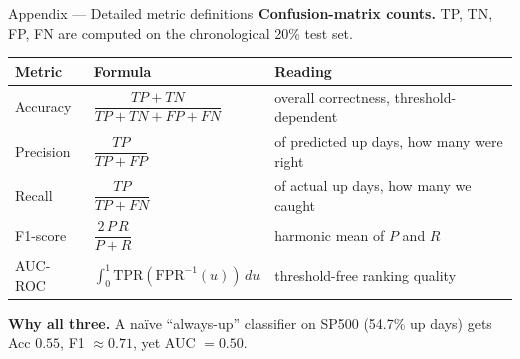 \documentclass[aspectratio=169,11pt]{beamer}
\newcommand{\heading}[1]{{\color{TecBlue}\textbf{#1}}}
\begin{document}
\begin{frame}{Appendix --- Detailed metric definitions}
\footnotesize
\heading{Confusion-matrix counts.} TP, TN, FP, FN are computed on the chronological 20\% test set.

\vspace{4pt}
\begin{center}
\renewcommand{\arraystretch}{1.25}
\begin{tabular}{@{}p{2.0cm} p{4.5cm} p{7.0cm}@{}}
\toprule
\textbf{Metric} & \textbf{Formula} & \textbf{Reading} \\
\midrule
Accuracy   & $\dfrac{TP+TN}{TP+TN+FP+FN}$                          & overall correctness, threshold-dependent \\
Precision  & $\dfrac{TP}{TP+FP}$                                   & of predicted up days, how many were right \\
Recall     & $\dfrac{TP}{TP+FN}$                                   & of actual up days, how many we caught \\
F1-score   & $\dfrac{2\,P\,R}{P+R}$                                & harmonic mean of $P$ and $R$ \\
AUC-ROC    & $\int_0^1 \mathrm{TPR}(\mathrm{FPR}^{-1}(u))\, du$    & threshold-free ranking quality \\
\bottomrule
\end{tabular}
\end{center}

\vspace{4pt}
\heading{Why all three.} A na\"ive ``always-up'' classifier on SP500 (54.7\% up days) gets Acc $0.55$, F1 $\approx 0.71$, yet AUC $= 0.50$.
\end{frame}
\end{document}
